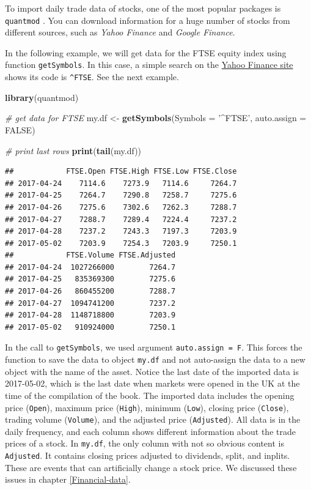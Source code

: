 \documentclass[11pt,]{book}
\newenvironment{Shaded}{\begin{snugshade}}{\end{snugshade}}
\newcommand{\KeywordTok}[1]{\textcolor[rgb]{0.27,0.27,0.27}{\textbf{#1}}}
\newcommand{\DataTypeTok}[1]{\textcolor[rgb]{0.27,0.27,0.27}{#1}}
\newcommand{\StringTok}[1]{\textcolor[rgb]{0.5,0.5,0.5}{#1}}
\newcommand{\CommentTok}[1]{\textcolor[rgb]{0.56,0.35,0.01}{\textit{#1}}}
\newcommand{\OtherTok}[1]{\textcolor[rgb]{0.56,0.35,0.01}{#1}}
\newcommand{\NormalTok}[1]{#1}
\begin{document}
To import daily trade data of stocks, one of the most popular packages
is \texttt{quantmod} \citep{quantmod2015}. You can download information
for a huge number of stocks from different sources, such as \emph{Yahoo
Finance} and \emph{Google Finance}. 

In the following example, we will get data for the FTSE equity index
using function \texttt{getSymbols}. In this case, a simple search on the
\href{https://finance.yahoo.com/}{Yahoo Finance site} shows its code is
\texttt{\^{}FTSE}. See the next example. 

\begin{Shaded}
\begin{Highlighting}[]
\KeywordTok{library}\NormalTok{(quantmod)}

\CommentTok{# get data for FTSE}
\NormalTok{my.df <-}\StringTok{ }\KeywordTok{getSymbols}\NormalTok{(}\DataTypeTok{Symbols =} \StringTok{'^FTSE'}\NormalTok{, }\DataTypeTok{auto.assign =} \OtherTok{FALSE}\NormalTok{)}

\CommentTok{# print last rows}
\KeywordTok{print}\NormalTok{(}\KeywordTok{tail}\NormalTok{(my.df))}
\end{Highlighting}
\end{Shaded}

\begin{verbatim}
##            FTSE.Open FTSE.High FTSE.Low FTSE.Close
## 2017-04-24    7114.6    7273.9   7114.6     7264.7
## 2017-04-25    7264.7    7290.8   7258.7     7275.6
## 2017-04-26    7275.6    7302.6   7262.3     7288.7
## 2017-04-27    7288.7    7289.4   7224.4     7237.2
## 2017-04-28    7237.2    7243.3   7197.3     7203.9
## 2017-05-02    7203.9    7254.3   7203.9     7250.1
##            FTSE.Volume FTSE.Adjusted
## 2017-04-24  1027266000        7264.7
## 2017-04-25   835369300        7275.6
## 2017-04-26   860455200        7288.7
## 2017-04-27  1094741200        7237.2
## 2017-04-28  1148718800        7203.9
## 2017-05-02   910924000        7250.1
\end{verbatim}

In the call to \texttt{getSymbols}, we used argument
\texttt{auto.assign\ =\ F}. This forces the function to save the data to
object \texttt{my.df} and not auto-assign the data to a new object with
the name of the asset. Notice the last date of the imported data is
2017-05-02, which is the last date when markets were opened in the UK at
the time of the compilation of the book. The imported data includes the
opening price (\texttt{Open}), maximum price (\texttt{High}), minimum
(\texttt{Low}), closing price (\texttt{Close}), trading volume
(\texttt{Volume}), and the adjusted price (\texttt{Adjusted}). All data
is in the daily frequency, and each column shows different information
about the trade prices of a stock. In \texttt{my.df}, the only column
with not so obvious content is \texttt{Adjusted}. It contains closing
prices adjusted to dividends, split, and inplits. These are events that
can artificially change a stock price. We discussed these issues in
chapter \ref{Financial-data}.
\end{document}
